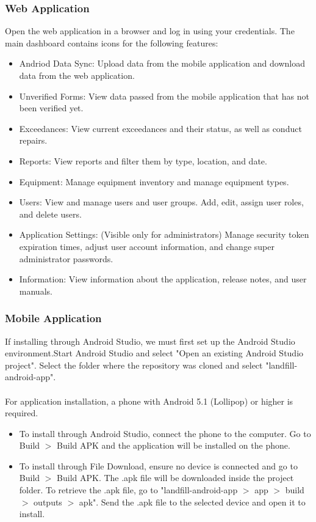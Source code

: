 \documentclass[12pt]{article}
\begin{document}
\subsubsection{Web Application}
Open the web application in a browser and log in using your credentials. The main dashboard contains icons for the following features:
\begin{itemize}
    \item Andriod Data Sync: Upload data from the mobile application and download data from the web application.
    \item Unverified Forms: View data passed from the mobile application that has not been verified yet.
    \item Exceedances: View current exceedances and their status, as well as conduct repairs.
    \item Reports: View reports and filter them by type, location, and date.
    \item Equipment: Manage equipment inventory and manage equipment types.
    \item Users: View and manage users and user groups. Add, edit, assign user roles, and delete users.
    \item Application Settings: (Visible only for administrators) Manage security token expiration times, adjust user account information, and change super administrator passwords.
    \item Information: View information about the application, release notes, and user manuals.
\end{itemize}
\subsubsection{Mobile Application}
If installing through Android Studio, we must first set up the Android Studio environment.Start Android Studio and select "Open an existing Android Studio project". Select the folder where the repository was cloned and select "landfill-android-app". \\\\
For application installation, a phone with Android 5.1 (Lollipop) or higher is required. 
\begin{itemize}
\item To install through Android Studio, connect the phone to the computer. Go to Build $>$ Build APK and the application will be installed on the phone. 
\item To install through File Download, ensure no device is connected and go to Build $>$ Build APK. The .apk file will be downloaded inside the project folder. To retrieve the .apk file, go to "landfill-android-app $>$ app $>$ build $>$ outputs $>$ apk". Send the .apk file to the selected device and open it to install.
\end{itemize}
\end{document}
